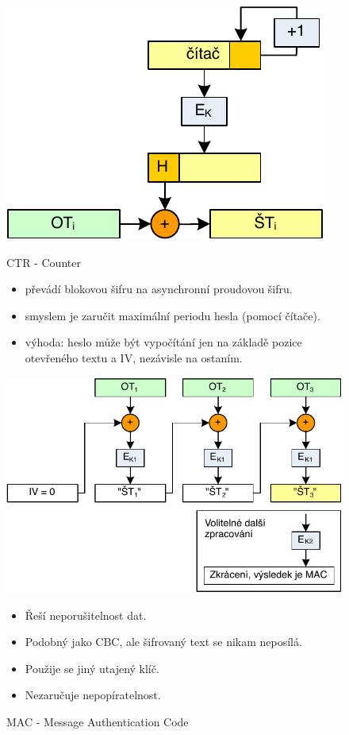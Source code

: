 \documentclass{szzclass}
\begin{document}
\begin{figure}[ht!]
\centering
\begin{minipage}{.5\textwidth}
  \centering
  \includegraphics[width=.5\linewidth]{topics/bi-spol-07/images/ctr}
  \caption{CTR - Counter}
  \begin{itemize}
    \item převádí blokovou šifru na asynchronní proudovou šifru.
    \item smyslem je zaručit maximální periodu hesla (pomocí čítače).
    \item výhoda: heslo může být vypočítání jen na základě pozice otevřeného textu a IV, nezávisle na ostaním.
  \end{itemize}
\end{minipage}%
\begin{minipage}{.5\textwidth}
  \centering
  \includegraphics[width=.75\linewidth]{topics/bi-spol-07/images/mac}
  \caption{MAC - Message Authentication Code}
  \begin{itemize}
    \item Řeší neporušitelnost dat.
    \item Podobný jako CBC, ale šifrovaný text se nikam neposílá. 
    \item Použije se jiný utajený klíč.
    \item Nezaručuje nepopíratelnost.
  \end{itemize}
\end{minipage}
\end{figure}
\end{document}

